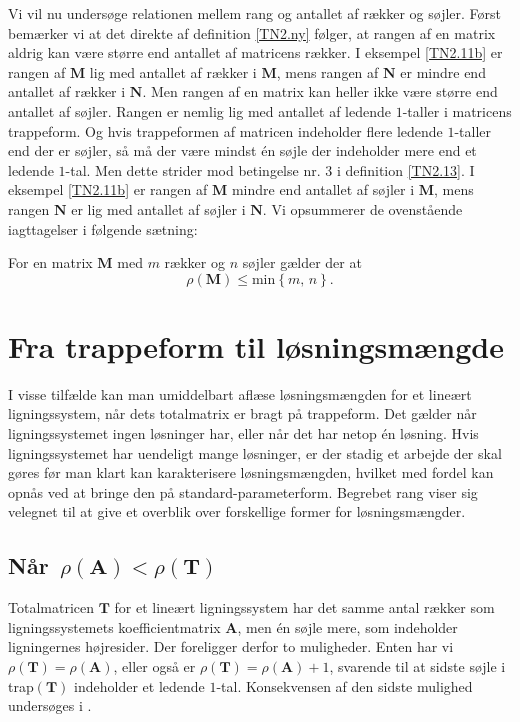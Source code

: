 Vi vil nu undersøge relationen mellem rang og antallet af rækker og søjler. Først bemærker vi at det direkte af definition \ref{TN2.ny} følger, at rangen af en matrix aldrig kan være større end antallet af matricens rækker.\bs
I eksempel \ref{TN2.11b} er rangen af $\mathbf M$ lig med antallet af rækker i $\mathbf M$, mens rangen af $\mathbf N$ er mindre end antallet af rækker i $\mathbf N$.\bs
Men rangen af en matrix kan heller ikke være større end antallet af søjler. Rangen er nemlig lig med antallet af ledende $1$-taller i matricens trappeform. Og hvis trappeformen af matricen indeholder flere ledende $1$-taller end der er søjler, så må der være mindst én søjle der indeholder mere end et ledende $1$-tal. Men dette strider mod betingelse nr. $3$ i definition \ref{TN2.13}.\bs
I eksempel \ref{TN2.11b} er rangen af $\mathbf M$ mindre end antallet af søjler i $\mathbf M$, mens rangen $\mathbf N$ er lig med antallet af søjler i $\mathbf N$.\bs
Vi opsummerer de ovenstående iagttagelser i følgende sætning:

\begin{theorem}
For en matrix $\mathbf M$ med $m$ rækker og $n$ søjler gælder der at
\begin{equation}
\rho(\mathbf M )\leq \mathrm{min}\left\{m,\,n\right\}.
\end{equation}
\end{theorem}

\section{Fra trappeform til løsningsmængde}\label{TN2.14}
I visse tilfælde kan man umiddelbart aflæse løsningsmængden for et lineært lig\-ningssystem, når dets totalmatrix er bragt på trappeform. Det gælder når ligningssystemet ingen løsninger har, eller når det har netop én løsning. Hvis ligningssystemet har uendeligt mange løsninger, er der stadig et arbejde der skal gøres før man klart kan karakterisere løsningsmængden, hvilket med fordel kan opnås ved at bringe den på standard-parameterform. Begrebet rang viser sig velegnet til at give et overblik over forskellige former for løs\-nings\-mæng\-der.

\subsection{Når $\,\rho(\mathbf A)< \rho(\mathbf T)$}
Totalmatricen $\mathbf T$ for et lineært ligningssystem har det samme antal rækker som lig\-nings\-sy\-stem\-ets koefficientmatrix $\mathbf A$, men én søjle mere, som indeholder ligningernes højresider. Der foreligger derfor to muligheder. Enten har vi $\rho(\mathbf T)=\rho(\mathbf A)$, eller også er $\rho(\mathbf T)=\rho(\mathbf A)+1$, svarende til at sidste søjle i trap$(\mathbf T)$ indeholder et ledende $1$-tal. Konsekvensen af den sidste mulighed undersøges i . 


